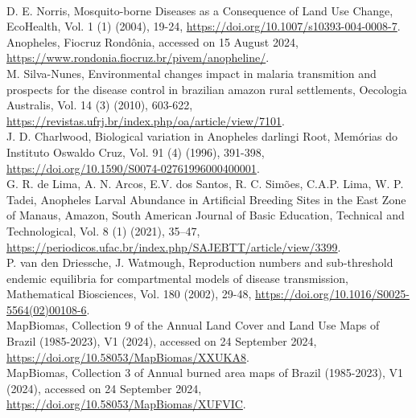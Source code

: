 \documentclass[a4paper,fleqn]{cas-dc}
\begin{document}
\begin{thebibliography}{00}
\\
 D. E. Norris, Mosquito-borne Diseases as a Consequence of Land Use Change, EcoHealth, Vol. 1 (1) (2004), 19-24, \href{https://doi.org/10.1007/s10393-004-0008-7}{https://doi.org/10.1007/s10393-004-0008-7}.
\\
 Anopheles, Fiocruz Rondônia, accessed on 15 August 2024, \href{https://www.rondonia.fiocruz.br/pivem/anopheline/}{https://www.rondonia.fiocruz.br/pivem/anopheline/}.
\\
 M. Silva-Nunes, Environmental changes impact in malaria transmition and prospects for the disease control in brazilian amazon rural settlements, Oecologia Australis, Vol. 14 (3) (2010), 603-622, \href{https://revistas.ufrj.br/index.php/oa/article/view/7101}{https://revistas.ufrj.br/index.php/oa/article/view/7101}.
\\
 J. D. Charlwood, Biological variation in Anopheles darlingi Root, Memórias do Instituto Oswaldo Cruz, Vol. 91 (4) (1996), 391-398, \href{ https://doi.org/10.1590/S0074-02761996000400001}{ https://doi.org/10.1590/S0074-02761996000400001}.
\\
 G. R. de Lima, A. N. Arcos, E.V. dos Santos, R. C. Simões, C.A.P. Lima, W. P. Tadei, Anopheles Larval Abundance in Artificial Breeding Sites in the 
East Zone of Manaus, Amazon, South American Journal of Basic Education, Technical and Technological, Vol. 8 (1) (2021), 35–47, \href{https://periodicos.ufac.br/index.php/SAJEBTT/article/view/3399}{ https://periodicos.ufac.br/index.php/SAJEBTT/article/view/3399}.
\\
 P. van den Driessche, J. Watmough, Reproduction numbers and sub-threshold endemic equilibria for compartmental models of disease transmission, Mathematical Biosciences, Vol. 180 (2002), 29-48, \href{https://doi.org/10.1016/S0025-5564(02)00108-6}{ https://doi.org/10.1016/S0025-5564(02)00108-6}.
\\
 MapBiomas, Collection 9 of the Annual Land Cover and Land Use Maps of Brazil (1985-2023), V1 (2024), accessed on 24 September 2024, \href{https://doi.org/10.58053/MapBiomas/XXUKA8}{https://doi.org/10.58053/MapBiomas/XXUKA8}.
\\
 MapBiomas, Collection 3 of Annual burned area maps of Brazil (1985-2023), V1 (2024), accessed on 24 September 2024, \href{https://doi.org/10.58053/MapBiomas/XUFVIC}{https://doi.org/10.58053/MapBiomas/XUFVIC}.

\end{thebibliography}
\end{document}

